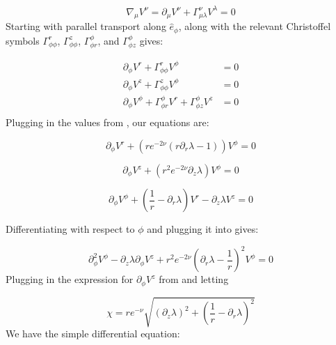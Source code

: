 \documentclass{article}
\begin{document}
\begin{equation}
\label{eq:x-par-xport}
\nabla_\mu V^{\nu}=\partial_\mu V^\nu+\Gamma^\nu_{\mu\lambda} V^\lambda=0
\end{equation}	  	
Starting with parallel transport along $\hat{e}_{\phi}$,  along with the relevant Christoffel symbols $\Gamma^{r}_{\phi\phi}$, $\Gamma^{z}_{\phi\phi}$, $\Gamma^{\phi}_{\phi r}$, and $\Gamma^{\phi}_{\phi z}$ gives:
	  	
\begin{equation}
\begin{aligned}
\partial_{\phi}V^{r}+\Gamma^{r}_{\phi\phi}V^{\phi}&=0\\
\partial_{\phi}V^{z}+\Gamma^{z}_{\phi\phi}V^{\phi}&=0\\
\partial_{\phi}V^{\phi}+\Gamma^{\phi}_{\phi r}V^{r}+\Gamma^{\phi}_{\phi z}V^{z}&=0\\
\end{aligned}
\end{equation}
Plugging in the values from , our equations are: 

\begin{equation}
\partial_{\phi}V^{r}+\left(re^{-2\nu}\left(r\partial_{r}\lambda-1\right)\right)V^{\phi}=0\label{eq:V-r-phi}
\end{equation}

\begin{equation}
\label{eq:V_z-V_phi}
\partial_{\phi}V^{z}+\left(r^{2}e^{-2\nu}\partial_{z}\lambda\right)V^{\phi}=0
\end{equation}

\begin{equation}
\partial_{\phi}V^{\phi}+\left(\frac{1}{r}-\partial_{r}\lambda\right)V^{r}-\partial_{z}\lambda V^{z}=0\label{eq:V-phi-r-z}
\end{equation}

Differentiating  with respect to $\phi$ and plugging it into  gives:

\begin{equation}
\partial^{2}_{\phi}V^{\phi}-\partial_z\lambda\partial_{\phi}V^z+r^{2}e^{-2\nu}\left(\partial_r\lambda-\frac{1}{r}\right)^2V^{\phi}=0
\end{equation}
Plugging in the expression for $\partial_{\phi}V^z$ from
 and letting 

\begin{equation}
\label{eq:def-chi}
\chi=re^{-\nu}\sqrt{\left(\partial_z\lambda\right)^2+\left(\frac{1}{r}-\partial_r\lambda\right)^2}
\end{equation}
We have the simple differential equation:
\end{document}
